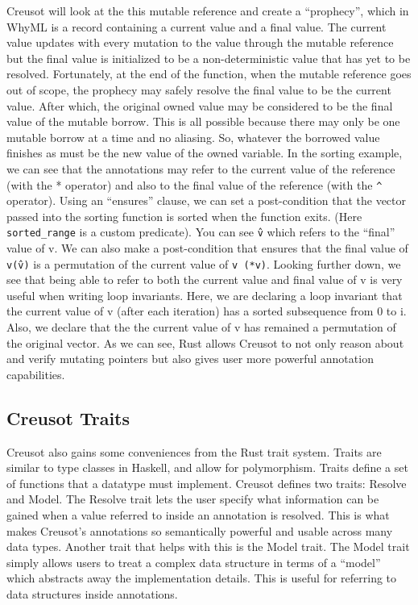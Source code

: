 \documentclass[12pt]{article}
\begin{document}
Creusot will look at the this mutable reference and create a ``prophecy'', which in WhyML is a record containing a current value and a final value.
The current value updates with every mutation to the value through the mutable reference but the final value is initialized to be a non-deterministic value that has yet to be resolved.
Fortunately, at the end of the function, when the mutable reference goes out of scope, the prophecy may safely resolve the final value to be the current value.
After which, the original owned value may be considered to be the final value of the mutable borrow.
This is all possible because there may only be one mutable borrow at a time and no aliasing.
So, whatever the borrowed value finishes as must be the new value of the owned variable.
In the sorting example, we can see that the annotations may refer to the current value of the reference (with the * operator) and also to the final value of the reference (with the \texttt{\^} operator).
Using an ``ensures'' clause, we can set a post-condition that the vector passed into the sorting function is sorted when the function exits.
(Here \texttt{sorted\_range} is a custom predicate).
You can see \texttt{\^v} which refers to the ``final'' value of v.
We can also make a post-condition that ensures that the final value of \texttt{v(\^v)} is a permutation of the current value of \texttt{v (*v)}.
Looking further down, we see that being able to refer to both the current value and final value of v is very useful when writing loop invariants.
Here, we are declaring a loop invariant that the current value of v (after each iteration) has a sorted subsequence from 0 to i.
Also, we declare that the the current value of v has remained a permutation of the original vector.
As we can see, Rust allows Creusot to not only reason about and verify mutating pointers but also gives user more powerful annotation capabilities.

\subsection{Creusot Traits}
Creusot also gains some conveniences from the Rust trait system.
Traits are similar to type classes in Haskell, and allow for polymorphism.
Traits define a set of functions that a datatype must implement.
Creusot defines two traits: Resolve and Model.
The Resolve trait lets the user specify what information can be gained when a value referred to inside an annotation is resolved.
This is what makes Creusot's annotations so semantically powerful and usable across many data types.
Another trait that helps with this is the Model trait. The Model trait simply allows users to treat a complex data structure in terms of a ``model'' which abstracts away the implementation details.
This is useful for referring to data structures inside annotations.
\end{document}

